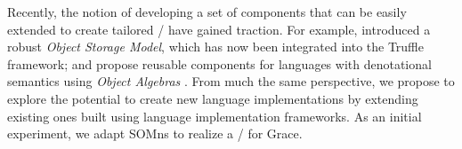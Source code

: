 Recently, the notion of developing a set of components that can be easily extended to create tailored \VMs/ have gained traction. For example, \citet{WoB2014} introduced a robust \emph{Object Storage Model}, which has now been integrated into the Truffle framework; and \citet{Inostroza2015} propose reusable components for languages with denotational semantics using \emph{Object Algebras} \cite{Oliveira2012}. From much the same perspective, we propose to explore the potential to create new language implementations by extending existing ones built using language implementation frameworks. As an initial experiment, we adapt SOMns to realize a \VM/ for Grace.


%




%






% 
